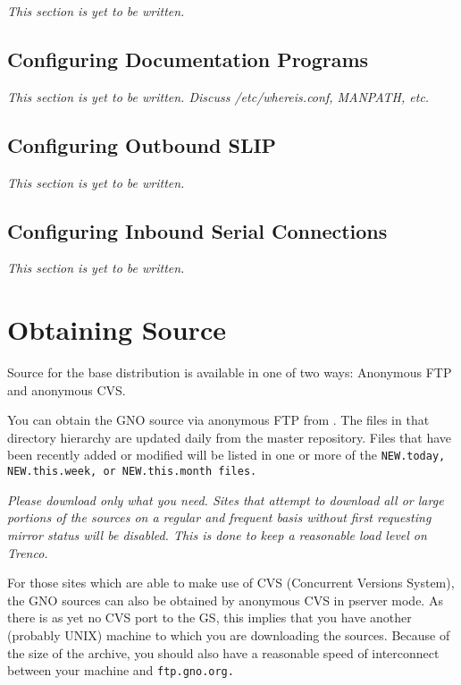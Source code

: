 \documentclass{report}
\begin{document}
\em This section is yet to be written. \rm

\subsection{Configuring Documentation Programs}

\em This section is yet to be written. 
Discuss /etc/whereis.conf, MANPATH, etc.
\rm

\subsection{Configuring Outbound SLIP}

\em This section is yet to be written. \rm

\subsection{Configuring Inbound Serial Connections}

\em This section is yet to be written. \rm

\section{Obtaining Source}

Source for the base distribution is available in one of two ways:
Anonymous FTP and anonymous CVS.

You can obtain the GNO source via anonymous FTP from 
.
The files in that directory hierarchy are updated daily from the
master repository.  Files that have been recently added or modified
will be listed in one or more of the 
\tt NEW.today\rm ,
\tt NEW.this.week\rm , or
\tt NEW.this.month \rm
files.

\em Please download only what you need.  Sites that attempt to download
all or large portions of the sources on a regular and frequent basis
without first requesting mirror status will be disabled. This is done
to keep a reasonable load level on Trenco.\rm

For those sites which are able to make use of CVS (Concurrent Versions
System), the GNO sources can also be obtained by anonymous CVS in 
pserver mode.  As there is as yet no CVS port to the GS, this implies
that you have another (probably UNIX) machine to which you are downloading
the sources.  Because of the size of the archive, you should also have
a reasonable speed of interconnect between your machine and \tt ftp.gno.org\rm.
\end{document}
